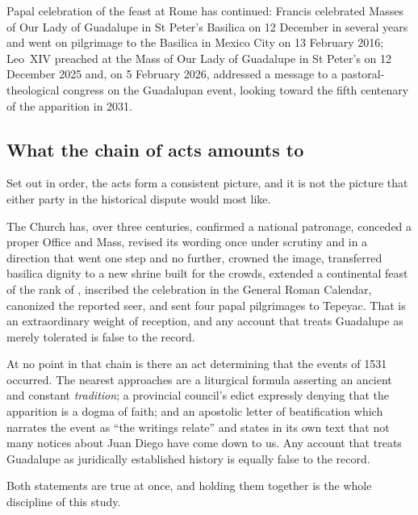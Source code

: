 Papal celebration of the feast at Rome has continued: Francis
celebrated Masses of Our Lady of Guadalupe in St Peter's Basilica on
12 December in several years and went on pilgrimage to the Basilica in
Mexico City on 13 February 2016; Leo~XIV preached at the Mass of
Our Lady of Guadalupe in St Peter's on 12 December 2025 and, on 5
February 2026, addressed a message to a pastoral-theological congress
on the Guadalupan event, looking toward the fifth centenary of the
apparition in 2031.

\subsection{What the chain of acts amounts to}

Set out in order, the acts form a consistent picture, and it is not
the picture that either party in the historical dispute would most
like.

The Church has, over three centuries, confirmed a national patronage,
conceded a proper Office and Mass, revised its wording once under
scrutiny and in a direction that went one step and no further, crowned
the image, transferred basilica dignity to a new shrine built for the
crowds, extended a continental feast of the rank of ,
inscribed the celebration in the General Roman Calendar, canonized the
reported seer, and sent four papal pilgrimages to Tepeyac. That is an
extraordinary weight of reception, and any account that treats
Guadalupe as merely tolerated is false to the record.

At no point in that chain is there an act determining that the events
of 1531 occurred. The nearest approaches are a liturgical formula
asserting an ancient and constant \emph{tradition}; a provincial
council's edict expressly denying that the apparition is a dogma of
faith; and an apostolic letter of beatification which narrates the
event as ``the writings relate'' and states in its own text that not
many notices about Juan Diego have come down to us. Any account that
treats Guadalupe as juridically established history is equally false
to the record.

Both statements are true at once, and holding them together is the
whole discipline of this study.
